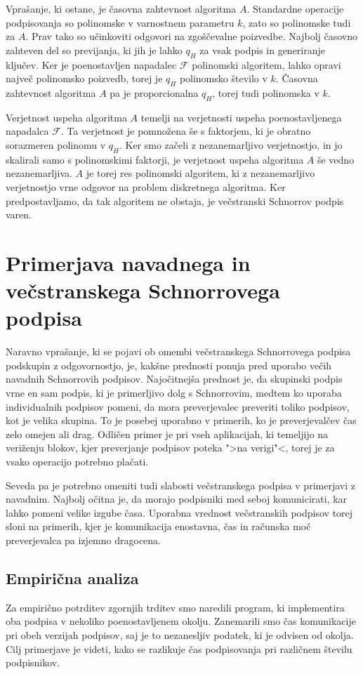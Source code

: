 \documentclass[isrm2, tisk]{fmfdelo}
\begin{document}
Vprašanje, ki ostane, je časovna zahtevnost algoritma $A$. Standardne operacije podpisovanja
so polinomske v varnostnem parametru $k$, zato so polinomske tudi za $A$. Prav tako so učinkoviti
odgovori na zgoščevalne poizvedbe. Najbolj časovno zahteven del so previjanja, ki jih je lahko $q_H$
za vsak podpis in generiranje ključev. Ker je poenostavljen napadalec $\mathcal{F}$ polinomski algoritem,
lahko opravi največ polinomsko poizvedb, torej je $q_H$ polinomsko število v $k$. Časovna zahtevnost
algoritma $A$ pa je proporcionalna $q_H$, torej tudi polinomska v $k$.

Verjetnost uspeha algoritma $A$ temelji na verjetnosti uspeha poenostavljenega napadalca $\mathcal{F}$.
Ta verjetnost je pomnožena še s faktorjem, ki je obratno sorazmeren polinomu v $q_H$. Ker smo
začeli z nezanemarljivo verjetnostjo, in jo skalirali samo s polinomskimi faktorji, je verjetnost
uspeha algoritma $A$ še vedno nezanemarljiva. $A$ je torej res polinomski algoritem, ki z
nezanemarljivo verjetnostjo vrne odgovor na problem diskretnega algoritma. Ker predpostavljamo, da
tak algoritem ne obstaja, je večstranski Schnorrov podpis varen.

\section{Primerjava navadnega in večstranskega Schnorrovega podpisa}
Naravno vprašanje, ki se pojavi ob omembi večstranskega Schnorrovega podpisa podskupin z odgovornostjo,
je, kakšne prednosti ponuja pred uporabo večih navadnih Schnorrovih podpisov. Najočitnejša prednost
je, da skupinski podpis vrne en sam podpis, ki je primerljivo dolg s Schnorrovim, medtem ko uporaba
individualnih podpisov pomeni, da mora preverjevalec preveriti toliko podpisov, kot je velika
skupina. To je posebej uporabno v primerih, ko je preverjevalčev čas zelo omejen ali drag. Odličen
primer je pri vseh aplikacijah, ki temeljijo na veriženju blokov, kjer preverjanje podpisov poteka
">na verigi"<, torej je za vsako operacijo potrebno plačati.

Seveda pa je potrebno omeniti tudi slabosti večstranskega podpisa v primerjavi z navadnim. Najbolj
očitna je, da morajo podpisniki med seboj komunicirati, kar lahko pomeni velike izgube časa. Uporabna
vrednost večstranskih podpisov torej sloni na primerih, kjer je komunikacija enostavna, čas in
računska moč preverjevalca pa izjemno dragocena.

\subsection{Empirična analiza}
Za empirično potrditev zgornjih trditev smo naredili program, ki implementira oba podpisa v nekoliko
poenostavljenem okolju. Zanemarili smo čas komunikacije pri obeh verzijah podpisov, saj je to nezanesljiv
podatek, ki je odvisen od okolja. Cilj primerjave je videti, kako se razlikuje čas podpisovanja
pri različnem številu podpisnikov.
\end{document}
